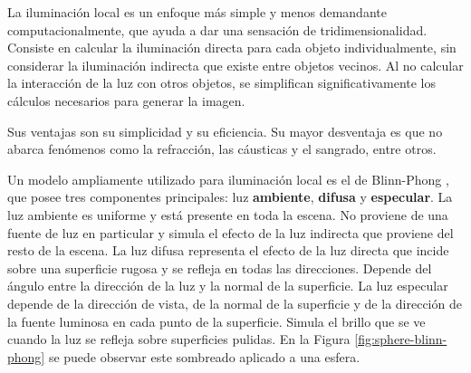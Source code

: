 La iluminación local \cite[p.~375]{rtr} es un enfoque más simple y menos demandante computacionalmente, que ayuda a dar una sensación de tridimensionalidad.
Consiste en calcular la iluminación directa para cada objeto individualmente, sin considerar la iluminación indirecta que existe entre objetos vecinos.
Al no calcular la interacción de la luz con otros objetos, se simplifican significativamente los cálculos necesarios para generar la imagen.

Sus ventajas son su simplicidad y su eficiencia.
Su mayor desventaja es que no abarca fenómenos como la refracción, las cáusticas y el sangrado, entre otros.

Un modelo ampliamente utilizado para iluminación local es el de Blinn-Phong \cite{blinn-phong}, que posee tres componentes principales: luz \textbf{ambiente}, \textbf{difusa} y \textbf{especular}.
La luz ambiente es uniforme y está presente en toda la escena.
No proviene de una fuente de luz en particular y simula el efecto de la luz indirecta que proviene del resto de la escena.
La luz difusa representa el efecto de la luz directa que incide sobre una superficie rugosa y se refleja en todas las direcciones.
Depende del ángulo entre la dirección de la luz y la normal de la superficie.
La luz especular depende de la dirección de vista, de la normal de la superficie y de la dirección de la fuente luminosa en cada punto de la superficie.
Simula el brillo que se ve cuando la luz se refleja sobre superficies pulidas.
En la Figura \ref{fig:sphere-blinn-phong} se puede observar este sombreado aplicado a una esfera.


